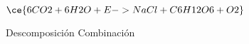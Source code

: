 $\ce{6CO2 + 6H2O + E -> NaCl + C6H12O6 + O2}$

\begin{oneparchoices}
    \choice Descomposición
    \choice Combinación
\end{oneparchoices}